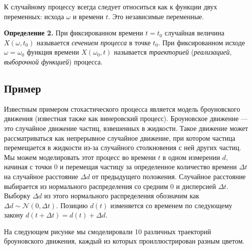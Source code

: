 \documentclass[11pt,a4paper]{article}
\begin{document}
К случайному процессу всегда следует относиться как к функции двух
переменных: исхода \(\omega\) и времени \(t\). Это независимые
переменные.

\textbf{Определение 2.} При фиксированном времени \(t = t_0\) случайная
величина \(X(\omega, t_0)\) называется \emph{сечением процесса} в точке
\(t_0\). При фиксированном исходе \(\omega = \omega_0\) функция времени
\(X(\omega_0, t)\) называется \emph{траекторией} (\emph{реализацией},
\emph{выборочной функцией}) процесса.

    \hypertarget{ux43fux440ux438ux43cux435ux440}{%
\subsection{Пример}\label{ux43fux440ux438ux43cux435ux440}}

Известным примером стохастического процесса является модель броуновского
движения (известная также как винеровский процесс). Броуновское движение
--- это случайное движение частиц, взвешенных в жидкости. Такое движение
может рассматриваться как непрерывное случайное движение, при котором
частица перемещается в жидкости из-за случайного столкновения с ней
других частиц. Мы можем моделировать этот процесс во времени \(t\) в
одном измерении \(d\), начиная с точки \(0\) и перемещая частицу за
определенное количество времени \(\Delta t\) на случайное расстояние
\(\Delta d\) от предыдущего положения. Случайное расстояние выбирается
из нормального распределения со средним \(0\) и дисперсией \(\Delta t\).
Выборку \(\Delta d\) из этого нормального распределения обозначим как
\(\Delta d \sim \mathcal{N}(0, \Delta t)\). Позицию \(d(t)\) изменяется
со временем по следующему закону \(d(t + \Delta t) = d(t) + \Delta d\).

На следующем рисунке мы смоделировали 10 различных траекторий
броуновского движения, каждый из которых проиллюстрирован разным цветом.
\end{document}
